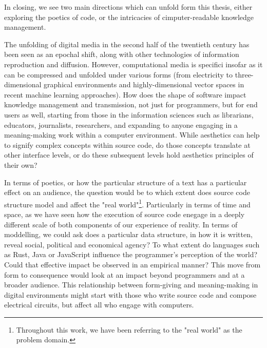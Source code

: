 \spacer

In closing, we see two main directions which can unfold form this thesis, either exploring the poetics of code, or the intricacies of cimputer-readable knowledge management.

The unfolding of digital media in the second half of the twentieth century has been seen as an epochal shift, along with other technologies of information reproduction and diffusion. However, computational media is specifici insofar as it can be compressed and unfolded under various forms (from electricity to three-dimensional graphical environments and highly-dimensional vector spaces in recent machine learning approaches). How does the shape of software impact knowledge management and transmission, not just for programmers, but for end users as well, starting from those in the information sciences such as librarians, educators, journalists, researchers, and expanding to anyone engaging in a meaning-making work within a computer environment. While aesthetics can help to signify complex concepts within source code, do those concepts translate at other interface levels, or do these subsequent levels hold aesthetics principles of their own?

In terms of poetics, or how the particular structure of a text has a particular effect on an audience, the question would be to which extent does source code structure model and affect the "real world"\footnote{Throughout this work, we have been referring to the "real world" as the problem domain.}. Particularly in terms of  time and space, as we have seen how the execution of source code enegage in a deeply different scale of both components of our experience of reality. In terms of moddelling, we could ask does a particular data structure, in how it is written, reveal social, political and economical agency? To what extent do languages such as Rust, Java or JavaScript influence the programmer's perception of the world? Could that effective impact be observed in an empirical manner? This move from form to consequence would look at an impact beyond programmers and at a broader audience. This relationship between form-giving and meaning-making in digital environments might start with those who write source code and compose electrical circuits, but affect all who engage with computers.